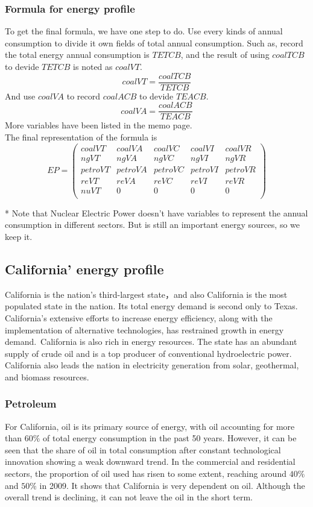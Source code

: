 \documentclass{mcmthesis}
\begin{document}
\subsubsection{Formula for energy profile}
To get the final formula, we have one step to do. Use every kinds of annual consumption to divide it own fields of total annual consumption.
Such as, record the total energy annual consumption is $TETCB$, and the result of using $coalTCB$ to devide $TETCB$ is noted as $coalVT$.
$$coalVT = \frac{coalTCB}{TETCB}$$
And use $coalVA$ to record $coalACB$ to devide $TEACB$.
$$coalVA = \frac{coalACB}{TEACB}$$
More variables have been listed in the memo page.\\
The final representation of the formula is
$$
  EP =
  \begin{pmatrix}
  coalVT & coalVA & coalVC & coalVI & coalVR  \\
  ngVT & ngVA & ngVC & ngVI & ngVR \\
  petroVT &　petroVA & petroVC & petroVI & petroVR \\
  reVT & reVA & reVC & reVI & reVR \\
  nuVT & 0 & 0 & 0 & 0\\
  \end{pmatrix}
$$

* Note that Nuclear Electric Power doesn't have variables to represent the annual consumption in different sectors.
But is still an important energy sources, so we keep it.

\subsection{California' energy profile}
California is the nation's third-largest state，and also California is the most populated state in the nation. Its total energy demand is second only to Texas.
California's extensive efforts to increase energy efficiency, along with the implementation of alternative technologies,
has restrained growth in energy demand. California is also rich in energy resources.
The state has an abundant supply of crude oil and is a top producer of conventional hydroelectric power.
California also leads the nation in electricity generation from solar, geothermal, and biomass resources.
\subsubsection{Petroleum}
  For California, oil is its primary source of energy, with oil accounting for more than $60\%$ of total energy consumption in the past 50 years.
  However, it can be seen that the share of oil in total consumption after constant technological innovation showing a weak downward trend.
  In the commercial and residential sectors, the proportion of oil used has risen to some extent, reaching around $40\%$ and $50\%$ in 2009.
  It shows that California is very dependent on oil. Although the overall trend is declining, it can not leave the oil in the short term.
\end{document}
